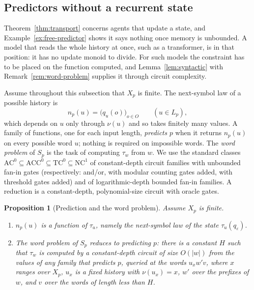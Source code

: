\documentclass[10pt]{article}
\newtheorem{proposition}[theorem]{Proposition}
\theoremstyle{definition}
\theoremstyle{remark}
\newcommand{\Obs}{O}
\newcommand{\eps}{\varepsilon}
\begin{document}
\subsection{Predictors without a recurrent state}
\label{subsec:parallel}

Theorem~\ref{thm:transport} concerns agents that update a state, and
Example~\ref{ex:free-predictor} shows it says nothing once memory is
unbounded.  A model that reads the whole history at once, such as a
transformer, is in that position: it has no update monoid to divide.
For such models the constraint has to be placed on the function
computed, and Lemma~\ref{lem:syntactic} with
Remark~\ref{rem:word-problem} supplies it through circuit complexity.

Assume throughout this subsection that $X_p$ is finite.  The
next-symbol law of a possible history is
\[
  n_p(u)=\bigl(q_u(o)\bigr)_{o\in\Obs}
  \qquad(u\in L_p),
\]
which depends on $u$ only through $\nu(u)$ and so takes finitely many
values.  A family of functions, one for each input length,
\emph{predicts $p$} when it returns $n_p(u)$ on every possible word
$u$; nothing is required on impossible words.  The \emph{word
problem} of $S_p$ is the task of computing $\tau_w$ from $w$.  We use
the standard classes
$\mathrm{AC}^0\subseteq\mathrm{ACC}^0\subseteq\mathrm{TC}^0
\subseteq\mathrm{NC}^1$ of constant-depth circuit families with
unbounded fan-in gates (respectively: and/or, with modular counting
gates added, with threshold gates added) and of logarithmic-depth
bounded fan-in families.  A reduction is a constant-depth,
polynomial-size circuit with oracle gates.

\begin{proposition}[Prediction and the word problem]
\label{prop:pred-word}
Assume $X_p$ is finite.
\begin{enumerate}[label=(\roman*)]
  \item $n_p(u)$ is a function of $\tau_u$, namely the next-symbol
        law of the state $\tau_u(q_\eps)$.
  \item The word problem of $S_p$ reduces to predicting $p$: there
        is a constant $H$ such that $\tau_w$ is computed by a
        constant-depth circuit of size $O(|w|)$ from the values of
        any family that predicts $p$, queried at the words
        $u_xw'v$, where $x$ ranges over $X_p$, $u_x$ is a fixed
        history with $\nu(u_x)=x$, $w'$ over the prefixes of $w$,
        and $v$ over the words of length less than $H$.
\end{enumerate}
\end{proposition}
\end{document}
